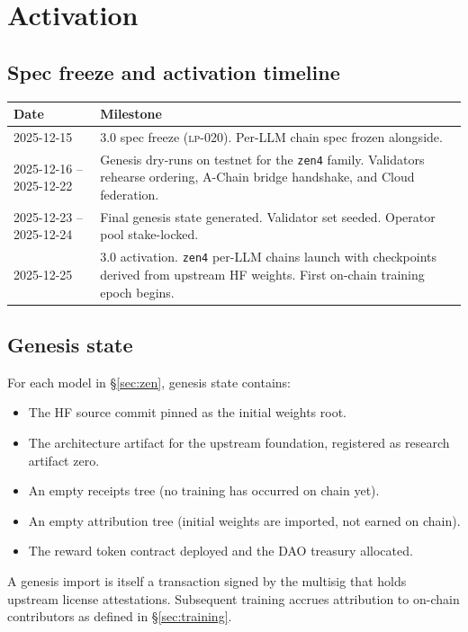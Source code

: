 \section{Activation}
\label{sec:activation}

\subsection{Spec freeze and activation timeline}

\begin{longtable}{p{3.5cm}p{10cm}}
\toprule
\textbf{Date} & \textbf{Milestone} \\
\midrule
\endhead
2025-12-15 & \Quasar{} 3.0 spec freeze (\textsc{lp-020}). Per-LLM chain spec frozen alongside. \\
2025-12-16 -- 2025-12-22 & Genesis dry-runs on testnet for the \texttt{zen4} family. Validators rehearse \BlockSTM{} ordering, A-Chain bridge handshake, and \Lux{} Cloud federation. \\
2025-12-23 -- 2025-12-24 & Final genesis state generated. Validator set seeded. Operator pool stake-locked. \\
2025-12-25 & \Quasar{} 3.0 activation. \texttt{zen4} per-LLM chains launch with checkpoints derived from upstream HF weights. First on-chain training epoch begins. \\
\bottomrule
\end{longtable}

\subsection{Genesis state}

For each \Zen{} model in \S\ref{sec:zen}, genesis state contains:
\begin{itemize}[nosep]
\item The HF source commit pinned as the initial weights root.
\item The architecture artifact for the upstream foundation, registered as research artifact zero.
\item An empty receipts tree (no training has occurred on chain yet).
\item An empty attribution tree (initial weights are imported, not earned on chain).
\item The reward token contract deployed and the DAO treasury allocated.
\end{itemize}

A genesis import is itself a transaction signed by the \Zoo{} multisig that holds upstream license attestations. Subsequent training accrues attribution to on-chain contributors as defined in \S\ref{sec:training}.

